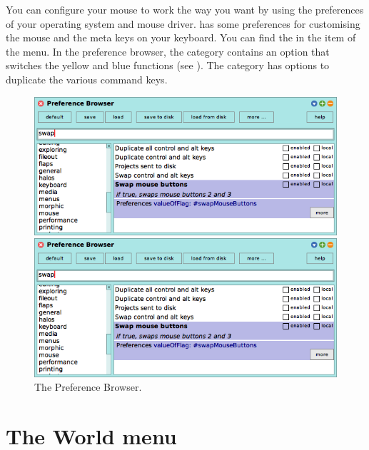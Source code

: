 \documentclass[a4paper,10pt,twoside]{book}
\begin{document}
You can configure your mouse to work the way you want by using the preferences of your operating system and mouse driver.
\sq has some preferences for customising the mouse and the meta keys on your keyboard. You can find the  in the  item of the  menu. 
In the preference browser, the  category contains an option  that switches the yellow and blue functions (see ).  The  category has options to duplicate the various command keys.   


\begin{figure}[htb]
\ifluluelse
	{\centerline {\includegraphics[width=\textwidth]{PreferenceBrowser}}}
	{\centerline {\includegraphics[scale=0.7]{PreferenceBrowser}}}
\caption{The Preference Browser.\label{fig:prefBrowser}}
\end{figure}

\section{The World menu}
\end{document}

